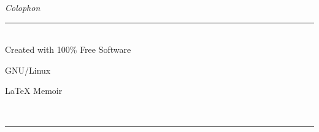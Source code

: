 %
%
%
%
%

\begin{vplace}
\centering
\emph{\LARGE Colophon}

\rule{0.5\textwidth}{0.4pt}\\[\baselineskip]

{\tiny Created with 100\% Free Software}

GNU/Linux

{\LaTeX} Memoir

\rule{0\textwidth}{0pt}\\[\baselineskip]%
\rule{0.5\textwidth}{0.4pt}\\[\baselineskip]
\end{vplace}

